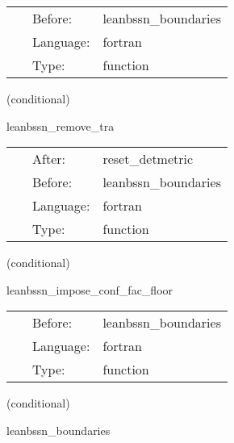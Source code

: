  \begin{tabular*}{160mm}{cll} 
~ & Before:  & leanbssn\_boundaries \\ 
~ & Language:  & fortran \\ 
~ & Type:  & function \\ 
\end{tabular*} 


\vspace{5mm}

   (conditional) 

\hspace{5mm} leanbssn\_remove\_tra 

\hspace{5mm}{\it remove trace of a } 


\hspace{5mm}

 \begin{tabular*}{160mm}{cll} 
~ & After:  & reset\_detmetric \\ 
~ & Before:  & leanbssn\_boundaries \\ 
~ & Language:  & fortran \\ 
~ & Type:  & function \\ 
\end{tabular*} 


\vspace{5mm}

   (conditional) 

\hspace{5mm} leanbssn\_impose\_conf\_fac\_floor 

\hspace{5mm}{\it make sure conformal factor does not drop below specified value } 


\hspace{5mm}

 \begin{tabular*}{160mm}{cll} 
~ & Before:  & leanbssn\_boundaries \\ 
~ & Language:  & fortran \\ 
~ & Type:  & function \\ 
\end{tabular*} 


\vspace{5mm}

   (conditional) 

\hspace{5mm} leanbssn\_boundaries 

